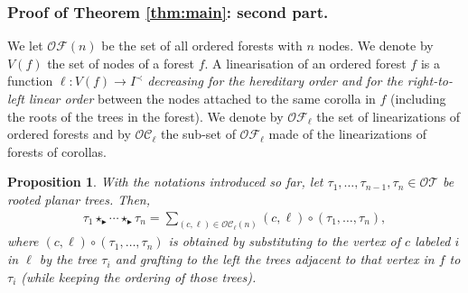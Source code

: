 \documentclass[12pt]{article}
\newcommand{\btr}{\blacktriangleright}
\newtheorem{proposition}[theorem]{Proposition}
\begin{document}
\subsubsection{Proof of Theorem \ref{thm:main}: second part.}

We let $\mathcal{O}\mathcal{F}(n)$ be the set of all ordered forests with $n$ nodes. We denote by $V(f)$ the set of nodes of a forest $f$.
A linearisation of an ordered forest $f$ is a function $\ell \colon V(f) \to I^{\prec}$ \emph{decreasing for the hereditary order and for the right-to-left linear order} between the nodes attached to the same corolla in $f$ (including the roots of the trees in the forest).
We denote by $\mathcal{O}\mathcal{F}_{\ell}$ the set of linearizations of ordered forests and by $\mathcal{O}\mathcal{C}_{\ell}$ the sub-set of $\mathcal{O}\mathcal{F}_{\ell}$ made of the linearizations of forests of corollas.
\begin{proposition} With the notations introduced so far, let $\tau_1,\ldots,\tau_{n-1}, \tau_{n} \in \mathcal{O}\mathcal{T}$ be rooted planar trees. Then,
\label{prop:formulathetaproduct}
\begin{align}
\label{eqn:seconstatement}
\tau_1 \star_{\btr} \cdots \star_{\btr }\tau_n = \sum_{(c,\ell) \in \mathcal{O}\mathcal{C}_{\ell}(n)} {(c,\ell)}\circ (\tau_1, \ldots, \tau_n),
\end{align}
where $(c,\ell) \circ (\tau_1, \ldots, \tau_n)$ is obtained by substituting to the vertex of $c$ labeled $i$ in $\ell$ by the tree $\tau_i$ and grafting to the left the trees adjacent to that vertex in $f$ to $\tau_i$ (while keeping the ordering of those trees).
\end{proposition}
\end{document}

